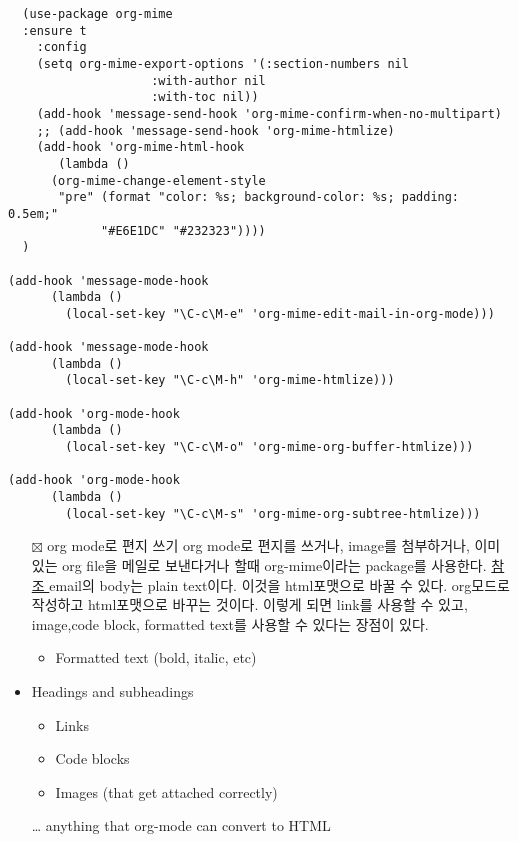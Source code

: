 \documentclass[11pt]{article}
\begin{document}
\begin{verbatim}
  (use-package org-mime
  :ensure t
    :config
    (setq org-mime-export-options '(:section-numbers nil
				    :with-author nil
				    :with-toc nil))
    (add-hook 'message-send-hook 'org-mime-confirm-when-no-multipart)
    ;; (add-hook 'message-send-hook 'org-mime-htmlize)
    (add-hook 'org-mime-html-hook
       (lambda ()
	  (org-mime-change-element-style
	   "pre" (format "color: %s; background-color: %s; padding: 0.5em;"
			 "#E6E1DC" "#232323"))))
  )

(add-hook 'message-mode-hook
	  (lambda ()
	    (local-set-key "\C-c\M-e" 'org-mime-edit-mail-in-org-mode)))

(add-hook 'message-mode-hook
	  (lambda ()
	    (local-set-key "\C-c\M-h" 'org-mime-htmlize)))

(add-hook 'org-mode-hook
	  (lambda ()
	    (local-set-key "\C-c\M-o" 'org-mime-org-buffer-htmlize)))

(add-hook 'org-mode-hook
	  (lambda ()
	    (local-set-key "\C-c\M-s" 'org-mime-org-subtree-htmlize)))
\end{verbatim}
\begin{itemize}
\item[{$\boxtimes$}] org mode로 편지 쓰기 org mode로 편지를 쓰거나, image를
첨부하거나, 이미 있는 org file을 메일로 보낸다거나 할때
org-mime이라는 package를 사용한다. \href{https://github.com/org-mime/org-mime}{참조 }email의 body는 plain
text이다. 이것을 html포맷으로 바꿀 수 있다. org모드로 작성하고
html포맷으로 바꾸는 것이다. 이렇게 되면 link를 사용할 수 있고,
image,code block, formatted text를 사용할 수 있다는 장점이 있다.
\begin{itemize}
\item Formatted text (bold, italic, etc)
\end{itemize}
\item Headings and subheadings
\begin{itemize}
\item Links
\item Code blocks
\item Images (that get attached correctly)
\end{itemize}
… anything that org-mode can convert to HTML
\end{itemize}
\end{document}
